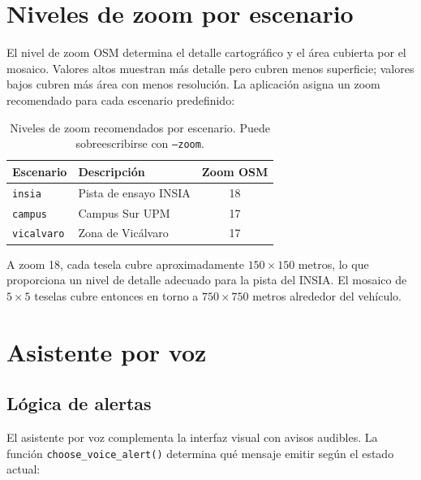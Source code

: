 \documentclass[10pt]{article}
\begin{document}
\section{Niveles de zoom por escenario}

El nivel de zoom OSM determina el detalle cartográfico y el área cubierta por el mosaico. Valores altos muestran más detalle pero cubren menos superficie; valores bajos cubren más área con menos resolución. La aplicación asigna un zoom recomendado para cada escenario predefinido:

\begin{table}[H]
\centering
\renewcommand{\arraystretch}{1.2}
\begin{tabular}{@{}llc@{}}
\toprule
\textbf{Escenario} & \textbf{Descripción} & \textbf{Zoom OSM} \\
\midrule
\texttt{insia}    & Pista de ensayo INSIA   & 18 \\
\texttt{campus}   & Campus Sur UPM          & 17 \\
\texttt{vicalvaro}& Zona de Vicálvaro       & 17 \\
\bottomrule
\end{tabular}
\caption{Niveles de zoom recomendados por escenario. Puede sobreescribirse con \texttt{--zoom}.}
\label{tab:zoom}
\end{table}

A zoom 18, cada tesela cubre aproximadamente $150 \times 150$ metros, lo que proporciona un nivel de detalle adecuado para la pista del INSIA. El mosaico de $5 \times 5$ teselas cubre entonces en torno a $750 \times 750$ metros alrededor del vehículo.

\section{Asistente por voz}

\subsection{Lógica de alertas}

El asistente por voz complementa la interfaz visual con avisos audibles. La función \texttt{choose\_voice\_alert()} determina qué mensaje emitir según el estado actual:
\end{document}
